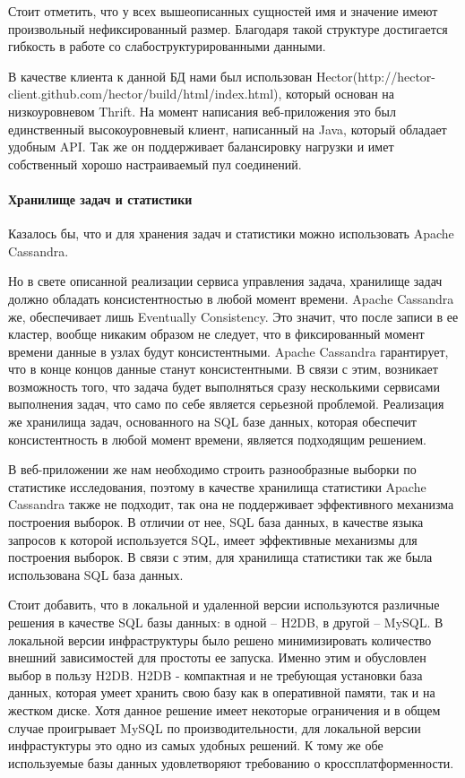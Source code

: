 \documentclass[12pt,a4paper]{extarticle}
\begin{document}
Стоит отметить, что у всех вышеописанных сущностей имя и значение имеют произвольный нефиксированный размер. Благодаря такой структуре достигается гибкость в работе со слабоструктурированными данными. 

В качестве клиента к данной БД нами был использован Hector(http://hector-client.github.com/hector/build/html/index.html), который основан на низкоуровневом Thrift. На момент написания веб-приложения это был единственный высокоуровневый клиент, написанный на Java, который обладает удобным API. Так же он поддерживает балансировку нагрузки и имет собственный хорошо настраиваемый пул соединений.

\paragraph{Хранилище задач и статистики}
Казалось бы, что и для хранения задач и статистики можно использовать Apache Cassandra. 

Но в свете описанной реализации сервиса управления задача, хранилище задач должно обладать консистентностью в любой момент времени. Apache Cassandra же, обеспечивает лишь Eventually Consistency. Это значит, что после записи в ее кластер, вообще никаким образом не следует, что в фиксированный момент времени данные в узлах будут консистентными. Apache Cassandra гарантирует, что в конце концов данные станут консистентными. В связи с этим, возникает возможность того, что задача будет выполняться сразу несколькими сервисами выполнения задач, что само по себе является серьезной проблемой. Реализация же хранилища задач, основанного на SQL базе данных, которая обеспечит консистентность в любой момент времени, является подходящим решением.

В веб-приложении же нам необходимо строить разнообразные выборки по статистике исследования, поэтому в качестве хранилища статистики Apache Cassandra также не подходит, так она не поддерживает эффективного механизма построения выборок. В отличии от нее, SQL база данных,  
в качестве языка запросов к которой используется SQL, имеет эффективные механизмы для построения выборок. В связи с этим, для хранилища статистики так же была использована SQL база данных.

Стоит добавить, что в локальной и удаленной версии используются различные решения в качестве SQL базы данных: в одной -- H2DB, в другой -- MySQL. В локальной версии инфраструктуры было решено минимизировать количество внешний зависимостей для простоты ее запуска.
Именно этим и обусловлен выбор в пользу H2DB. H2DB - компактная и не требующая установки база данных, которая умеет хранить свою базу как в оперативной памяти, так и на жестком диске. Хотя данное решение имеет некоторые ограничения и в общем случае проигрывает MySQL по производительности, для локальной версии инфрастуктуры это одно из самых удобных решений. К тому же обе используемые базы данных удовлетворяют требованию о кроссплатформенности.
\end{document}
